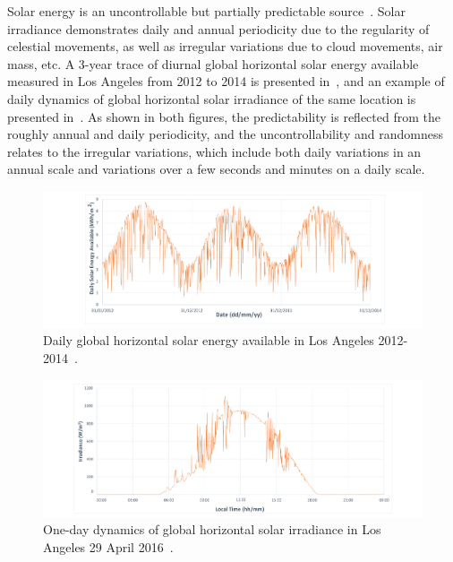 Solar energy is an uncontrollable but partially predictable source~\cite{heinemann2006forecasting, buchli2014dynamic}. Solar irradiance demonstrates daily and annual periodicity due to the regularity of celestial movements, as well as irregular variations due to cloud movements, air mass, etc. A 3-year trace of diurnal global horizontal solar energy available measured in Los Angeles from 2012 to 2014 is presented in~, and an example of daily dynamics of global horizontal solar irradiance of the same location is presented in~. As shown in both figures, the predictability is reflected from the roughly annual and daily periodicity, and the uncontrollability and randomness relates to the irregular variations, which include both daily variations in an annual scale and variations over a few seconds and minutes on a daily scale. 

\begin{figure}
    \centering
    \includegraphics[width=\columnwidth]{ch2_review/figures/solar_calendar}
    \caption{Daily global horizontal solar energy available in Los Angeles 2012-2014~\cite{nreldata}.}
    \label{Figure:solar_calendar}
\end{figure}

\begin{figure}
    \centering
    \includegraphics[width=\columnwidth]{ch2_review/figures/solar_plots}
    \caption{One-day dynamics of global horizontal solar irradiance in Los Angeles 29 April 2016~\cite{lmu}.}
    \label{Figure:solar_plots}
\end{figure}

